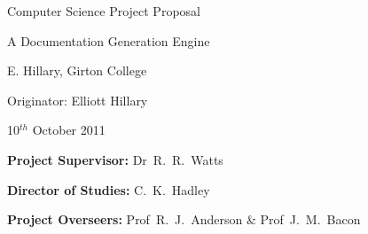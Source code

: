\documentclass[10pt,twoside,a4paper]{article}
\begin{document}
\vfil

\centerline{\Large Computer Science Project Proposal}
\vspace{0.4in}
\centerline{\Large A Documentation Generation Engine }
\vspace{0.4in}
\centerline{\large E. Hillary, Girton College}
\vspace{0.3in}
\centerline{\large Originator: Elliott Hillary}
\vspace{0.3in}
\centerline{\large 10$^{th}$ October 2011}

\vfil


\noindent
{\bf Project Supervisor:} Dr~R.~R.~Watts
\vspace{0.2in}

\noindent
{\bf Director of Studies:} C.~K.~Hadley
\vspace{0.2in}
\noindent
 
\noindent
{\bf Project Overseers:} Prof~R.~J.~Anderson  \& Prof~J.~M.~Bacon

\vfil

\tableofcontents


\end{document}
